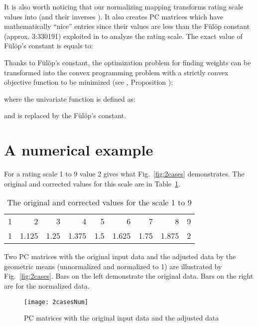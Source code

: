 \documentclass [12pt]{article}
\begin{document}
It is also worth noticing that our normalizing mapping transforms rating scale values into  (and their inverses ). It also creates PC matrices which have mathematically ``nice'' entries since their values are less than the F\"ul\"op constant (approx. 3:330191) exploited in \cite{FKS2010} to analyze the rating scale. The exact value of F\"ul\"op's constant is equals to:


Thanks to F\"ul\"op's constant, the optimization problem for finding weights can be transformed into the convex programming problem with a strictly convex objective function to be minimized (see \cite{Fulop08}, Proposition ):



\noindent where the univariate function is defined as:


\noindent and  is replaced by the F\"ul\"op's constant. 

\noindent 



\section{A numerical example}
\label{example}

For a rating scale 1 to 9 value 2 gives what Fig.~\ref{fig:2cases} demonstrates. The original and corrected values for this scale are in Table~\ref{tab:corr9}. 
\begin{table}[h]
  \centering
  \caption{The original and corrected values for the scale 1 to 9}
    \begin{tabular}{rrrrrrrrr} 
   \hline 
    1     & 2     & 3     & 4     & 5     & 6     & 7     & 8     & 9 \\
1     & 1.125 & 1.25  & 1.375 & 1.5   & 1.625 & 1.75  & 1.875 & 2 \\
  \hline
    \end{tabular}\label{tab:corr9}\end{table}
Two  PC matrices  with the original input data and the adjusted data by the geometric means (unnormalized and normalized to 1) are illustrated by Fig.~\ref{fig:2cases}. Bars on the left demonstrate the original data. Bars on the right are for the normalized data. 

\begin{figure}[p]
\centering
\texttt{[image: 2casesNum]}
\caption[PC matrices with the original input data and the adjusted data]{PC matrices with the original input data and the adjusted data}
\label{fig:2casesNum}
\end{figure}
\end{document}

